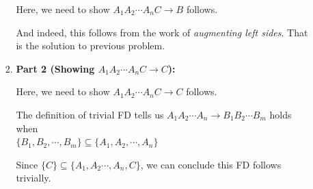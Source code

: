 \documentclass[12pt]{article}
\begin{document}
\begin{enumerate}[1.]
\begin{enumerate}[a)]
\begin{enumerate}[1.]
                \bigskip

                Here, we need to show $A_1A_2\cdots A_nC \to B$ follows.

                \bigskip

                And indeed, this follows from the work of \textit{augmenting left sides}.
                That is the solution to previous problem.

                \bigskip

                \item \textbf{Part 2 (Showing $A_1A_2 \cdots A_nC \to C$):}

                \bigskip

                Here, we need to show $A_1A_2 \cdots A_nC \to C$ follows.

                \bigskip

                The definition of trivial FD tells us $A_1A_2 \cdots A_n \to B_1B_2 \cdots B_m$
                holds when\\ $\{B_1,B_2,\cdots,B_m\} \subseteq \{A_1,A_2,\cdots,A_n\}$

                \bigskip

                Since $\{C\} \subseteq \{A_1,A_2\cdots,A_n,C\}$, we can conclude
                this FD follows trivially.

            \end{enumerate}












\end{enumerate}
\end{enumerate}
\end{document}
